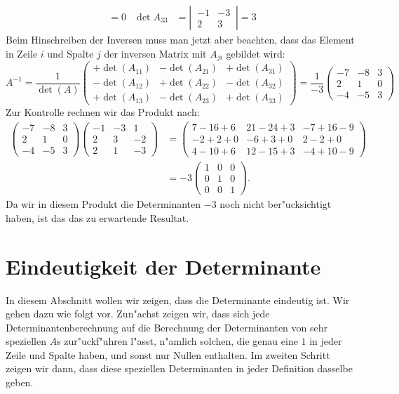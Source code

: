 \begin{beispiel}
\begin{align*}
=0
&
\det A_{33}&=\left|\,\begin{matrix}-1&-3\\ 2& 3\end{matrix}\,\right|
=3
\end{align*}
Beim Hinschreiben der Inversen muss man jetzt aber beachten,
dass das Element in Zeile $i$ und Spalte $j$ der inversen Matrix
mit $A_{ji}$ gebildet wird:
\[
A^{-1}=\frac1{\det(A)}\begin{pmatrix}
+\det(A_{11})&-\det(A_{21})&+\det(A_{31})\\
-\det(A_{12})&+\det(A_{22})&-\det(A_{32})\\
+\det(A_{13})&-\det(A_{23})&+\det(A_{33})
\end{pmatrix}
=\frac1{-3}\begin{pmatrix}
-7&-8& 3\\
 2& 1& 0\\
-4&-5& 3
\end{pmatrix}
\]
Zur Kontrolle rechnen wir das Produkt nach:
\begin{align*}
\begin{pmatrix}
-7&-8& 3\\
 2& 1& 0\\
-4&-5& 3
\end{pmatrix}
\begin{pmatrix}
-1&-3& 1\\
 2& 3&-2\\
 2& 1&-3
\end{pmatrix}
&=
\begin{pmatrix}
 7-16+6&21-24+3&-7+16-9\\
-2+ 2+0&-6+ 3+0& 2- 2+0\\
 4-10+6&12-15+3&-4+10-9
\end{pmatrix}
\\
&=-3\begin{pmatrix}
1&0&0\\
0&1&0\\
0&0&1
\end{pmatrix}.
\end{align*}
Da wir in diesem Produkt die Determinanten $-3$ noch nicht ber"ucksichtigt
haben, ist das das zu erwartende Resultat.
\end{beispiel}

\section{Eindeutigkeit der Determinante\label{deteindeutig}}
In diesem Abschnitt wollen wir zeigen, dass die Determinante
eindeutig ist.
Wir gehen dazu wie folgt vor.
Zun"achst zeigen wir,
dass sich jede Determinantenberechnung auf die Berechnung der Determinanten
von sehr speziellen $A$s zur"uckf"uhren l"asst, n"amlich solchen,
die genau eine $1$ in jeder Zeile und Spalte haben, und sonst nur
Nullen enthalten.
Im zweiten Schritt zeigen wir dann, dass diese
speziellen Determinanten in jeder Definition dasselbe geben.

